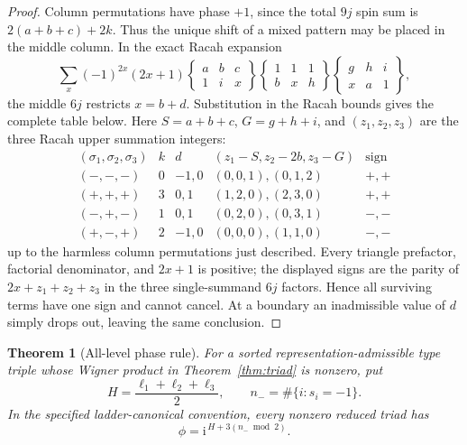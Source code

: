 \documentclass[12pt]{article}
\newtheorem{theorem}{Theorem}[section]
\theoremstyle{definition}
\theoremstyle{remark}
\newcommand{\ii}{\mathrm i}
\begin{document}
\begin{proof}
Column permutations have phase $+1$, since the total $9j$ spin sum is
$2(a+b+c)+2k$.  Thus the unique shift of a mixed pattern may be placed in the
middle column.  In the exact Racah expansion
\[
 \sum_x(-1)^{2x}(2x+1)
 \begin{Bmatrix}a&b&c\\1&i&x\end{Bmatrix}
 \begin{Bmatrix}1&1&1\\b&x&h\end{Bmatrix}
 \begin{Bmatrix}g&h&i\\x&a&1\end{Bmatrix},
\]
the middle $6j$ restricts $x=b+d$.  Substitution in the Racah bounds gives
the complete table below.  Here $S=a+b+c$, $G=g+h+i$, and
$(z_1,z_2,z_3)$ are the three Racah upper summation integers:
\[
\begin{array}{c|c|c|c|c}
 (\sigma_1,\sigma_2,\sigma_3)&k&d
 &(z_1-S,z_2-2b,z_3-G)&\text{sign}\\ \hline
 (-,-,-)&0&-1,0&(0,0,1),(0,1,2)&+,+\\
 (+,+,+)&3&0,1&(1,2,0),(2,3,0)&+,+\\
 (-,+,-)&1&0,1&(0,2,0),(0,3,1)&-,-\\
 (+,-,+)&2&-1,0&(0,0,0),(1,1,0)&-,-
\end{array}
\]
up to the harmless column permutations just described.  Every triangle
prefactor, factorial denominator, and $2x+1$ is positive; the displayed signs
are the parity of $2x+z_1+z_2+z_3$ in the three single-summand $6j$ factors.
Hence all surviving terms have one sign and cannot cancel.  At a boundary an
inadmissible value of $d$ simply drops out, leaving the same conclusion.
\end{proof}

\begin{theorem}[All-level phase rule]\label{thm:phase}
For a sorted representation-admissible type triple whose Wigner product in
Theorem~\ref{thm:triad} is nonzero, put
\[
 H=\frac{\ell_1+\ell_2+\ell_3}{2},\qquad
 n_-=\#\{i:s_i=-1\}.
\]
In the specified ladder-canonical convention, every nonzero reduced triad has
\begin{equation}\label{eq:phase}
 \phi=\ii^{\,H+3(n_-\bmod2)}.
\end{equation}
\end{theorem}
\end{document}
